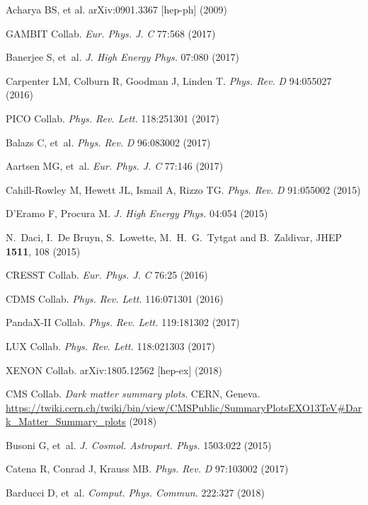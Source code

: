 \documentclass{ar-1col}
\begin{document}
{\begin{thebibliography}{175}
  Acharya BS, et al. arXiv:0901.3367 [hep-ph] (2009)

GAMBIT Collab. \textit{Eur. Phys. J.} \textit{C} 77:568 (2017)

Banerjee S, et~al. \textit{J. High Energy Phys.} 07:080 (2017)

Carpenter LM, Colburn R, Goodman J, Linden T. \textit{Phys. Rev.}
\textit{D} 94:055027 (2016)

PICO Collab. \textit{Phys. Rev. Lett.} 118:251301 (2017)

Balazs C, et~al. \textit{Phys. Rev.} \textit{D} 96:083002 (2017)

Aartsen MG, et~al. \textit{Eur. Phys. J.} \textit{C} 77:146 (2017)

Cahill-Rowley M, Hewett JL, Ismail A, Rizzo TG. \textit{Phys.
Rev.} \textit{D} 91:055002 (2015)

D'Eramo F, Procura M. \textit{J. High Energy Phys.} 04:054 (2015)

N.~Daci, I.~De Bruyn, S.~Lowette, M.~H.~G.~Tytgat and B.~Zaldivar, JHEP {\bf 1511}, 108 (2015)

CRESST Collab. \textit{Eur. Phys. J.} \textit{C} 76:25 (2016)

CDMS Collab. \textit{Phys. Rev. Lett.} 116:071301 (2016)

PandaX-II Collab. \textit{Phys. Rev. Lett.} 119:181302 (2017)

LUX Collab. \textit{Phys. Rev. Lett.} 118:021303 (2017)

XENON Collab. arXiv:1805.12562 [hep-ex] (2018)

CMS Collab. \textit{Dark \MakeLowercase{Matter Summary Plots}}. CERN, Geneva. \url{https://twiki.cern.ch/twiki/bin/view/CMSPublic/SummaryPlotsEXO13TeV#Dark_Matter_Summary_plots} (2018)

Busoni G, et~al. \textit{J. Cosmol. Astropart. Phys.} 1503:022 (2015)

Catena R, Conrad J, Krauss MB. \textit{Phys. Rev.} \textit{D} 97:103002 (2017)

Barducci D, et~al. \textit{Comput. Phys. Commun.} 222:327 (2018)


\end{thebibliography}}
\end{document}
